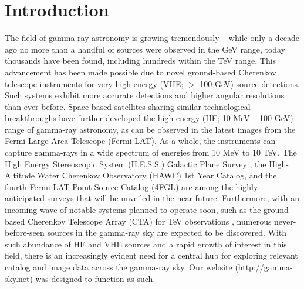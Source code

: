 \section{Introduction}

The field of gamma-ray astronomy is growing tremendously – while only a decade ago no more than a handful of sources were observed in the GeV range, today thousands have been found, including hundreds within the TeV range. This advancement has been made possible due to novel ground-based Cherenkov telescope instruments for very-high-energy (VHE; $>$ 100 GeV) source detections. Such systems exhibit more accurate detections and higher angular resolutions than ever before. Space-based satellites sharing similar technological breakthroughs have further developed the high-energy (HE; 10 MeV -- 100 GeV) range of gamma-ray astronomy, as can be observed in the latest images from the Fermi Large Area Telescope (Fermi-LAT). As a whole, the instruments can capture gamma-rays in a wide spectrum of energies from 10 MeV to 10 TeV. The High Energy Stereoscopic System (H.E.S.S.) Galactic Plane Survey \cite{hgps}, the High-Altitude Water Cherenkov Observatory (HAWC) 1st Year Catalog, and the fourth Fermi-LAT Point Source Catalog (4FGL) are among the highly anticipated surveys that will be unveiled in the near future. Furthermore, with an incoming wave of notable systems planned to operate soon, such as the ground-based Cherenkov Telescope Array (CTA) for TeV observations \cite{cta}, numerous never-before-seen sources in the gamma-ray sky are expected to be discovered. With such abundance of HE and VHE sources and a rapid growth of interest in this field, there is an increasingly evident need for a central hub for exploring relevant catalog and image data across the gamma-ray sky. Our website (\url{http://gamma-sky.net}) was designed to function as such.
